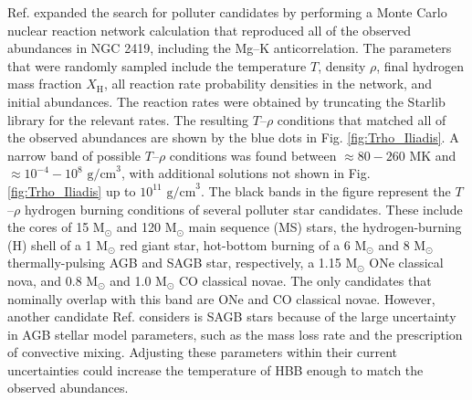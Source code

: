 Ref. \cite{Iliadis2016} expanded the search for polluter candidates by performing a Monte Carlo nuclear reaction network calculation that reproduced all of the observed abundances in NGC 2419, including the Mg--K anticorrelation. The parameters that were randomly sampled include the temperature $T$, density $\rho$, final hydrogen mass fraction $X_{\mathrm{H}}$, all reaction rate probability densities in the network, and initial abundances. The reaction rates were obtained by truncating the Starlib \cite{Sallaska2013} library for the relevant rates. The resulting $T$--$\rho$ conditions that matched all of the observed abundances are shown by the blue dots in Fig. \ref{fig:Trho_Iliadis}. A narrow band of possible $T$--$\rho$ conditions was found between $\approx80-260$ MK and $\approx10^{-4}-10^{8}$ $\mathrm{g/cm}^{3}$, with additional solutions not shown in Fig. \ref{fig:Trho_Iliadis} up to $10^{11}$ $\mathrm{g/cm}^{3}$. The black bands in the figure represent the $T$--$\rho$ hydrogen burning conditions of several polluter star candidates. These include the cores of 15 $\mathrm{M}_{\odot}$ and 120 $\mathrm{M}_{\odot}$ main sequence (MS) stars, the hydrogen-burning (H) shell of a 1 $\mathrm{M}_{\odot}$ red giant star, hot-bottom burning of a 6 $\mathrm{M}_{\odot}$ and 8 $\mathrm{M}_{\odot}$ thermally-pulsing AGB and SAGB star, respectively, a 1.15 $\mathrm{M}_{\odot}$ ONe classical nova, and 0.8 $\mathrm{M}_{\odot}$ and 1.0 $\mathrm{M}_{\odot}$ CO classical novae. The only candidates that nominally overlap with this band are ONe and CO classical novae. However, another candidate Ref. \cite{Iliadis2016} considers is SAGB stars because of the large uncertainty in AGB stellar model parameters, such as the mass loss rate and the prescription of convective mixing. Adjusting these parameters within their current uncertainties could increase the temperature of HBB enough to match the observed abundances.

